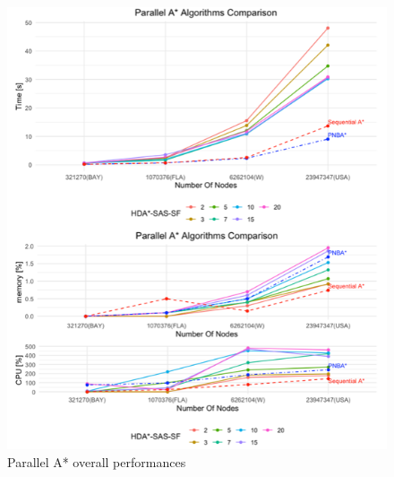 \documentclass[twocolumn, switch]{article} %
\begin{document}
\begin{figure}[ht!]
  \centering
  \includegraphics[width=1\linewidth]{others/allalgo.png}
  \caption{Parallel A* overall performances}
  \label{allalgo}
\end{figure}
\normalsize


\end{document}
